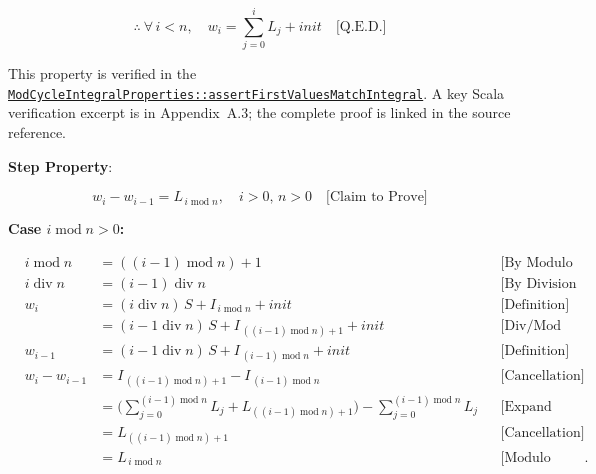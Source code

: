\begin{equation*}
\therefore \
\forall\, i < n,\quad w_i = \sum_{j=0}^i L_j + init \quad \text{[Q.E.D.]}
\end{equation*}

{\raggedright
This property is verified in the
\href{https://github.com/thiagomata/prime-numbers/blob/integral-cycle-article-v1.0.0/src/main/scala/v1/chapter4/cycle/integral/mod/ModCycleIntegralProperties.scala}{\texttt{ModCycleIntegralProperties::\allowbreak assertFirstValuesMatchIntegral}}.
A key Scala verification excerpt is in Appendix~A.3; the complete proof is
linked in the source reference.\par}

\textbf{Step Property}:

\begin{equation*}
w_i - w_{i-1} = L_{\, i \operatorname{mod} n}, \quad i>0,\, n>0
\quad \text{[Claim to Prove]}
\end{equation*}

\textbf{Case $i \operatorname{mod} n > 0$:}

\begin{equation*}
\begin{aligned}
&i \operatorname{mod} n &= ((i-1) \operatorname{mod} n) + 1 &&\text{[By Modulo Properties]} \\
&i \operatorname{div} n &= (i-1) \operatorname{div} n &&\text{[By Division Properties]} \\
&w_i &= (i \operatorname{div} n)\,S + I_{\,i\operatorname{mod} n} + init &&\text{[Definition]} \\
     &&= (i-1 \operatorname{div} n)\,S + I_{\,((i-1)\operatorname{mod} n)+1} + init &&\text{[Div/Mod property]} \\
&w_{i-1} &= (i-1 \operatorname{div} n)\,S + I_{\, (i-1)\operatorname{mod} n} + init &&\text{[Definition]} \\
&w_i-w_{i-1} &= I_{\,((i-1)\operatorname{mod} n)+1} - I_{\, (i-1)\operatorname{mod} n} &&\text{[Cancellation]} \\
    &&= \Big(\sum_{j=0}^{(i-1)\operatorname{mod} n} L_j + L_{((i-1)\operatorname{mod} n)+1}\Big)
       - \sum_{j=0}^{(i-1)\operatorname{mod} n} L_j &&\text{[Expand sum]} \\
    &&= L_{((i-1)\operatorname{mod} n)+1} &&\text{[Cancellation]} \\
    &&= L_{\,i \operatorname{mod} n} &&\text{[Modulo property]}.
\end{aligned}
\end{equation*}

